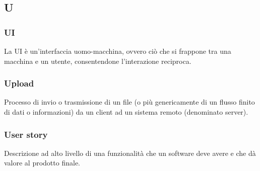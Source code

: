 \subsection*{\textbf{\hfill \Huge{U} \hfill}} 
\subsubsection*{UI}
La UI è un'interfaccia uomo-macchina, ovvero ciò che si frappone tra una macchina e un utente, consentendone l'interazione reciproca.

\subsubsection*{Upload}
Processo di invio o trasmissione di un file (o più genericamente di un flusso finito di dati o informazioni) da un client ad un sistema remoto (denominato server). 

\subsubsection*{User story}
Descrizione ad alto livello di una funzionalità che un software deve avere e che dà valore al prodotto finale.

